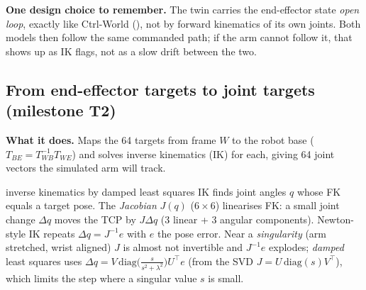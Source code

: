 \textbf{One design choice to remember.} The twin carries the end-effector state \emph{open loop}, exactly like Ctrl-World (), not by forward kinematics of its own joints. Both models then follow the same commanded path; if the arm cannot follow it, that shows up as IK flags, not as a slow drift between the two.

\subsection{From end-effector targets to joint targets (milestone T2) \done}\label{twin:sec:ik}
\textbf{What it does.} Maps the 64 targets from frame $W$ to the robot base ($T_{BE}=T_{WB}^{-1}T_{WE}$) and solves inverse kinematics (IK) for each, giving 64 joint vectors the simulated arm will track.

\begin{newc}{inverse kinematics by damped least squares}
IK finds joint angles $q$ whose FK equals a target pose. The \emph{Jacobian} $J(q)$ ($6\times6$) linearises FK: a small joint change $\Delta q$ moves the TCP by $J\Delta q$ (3 linear + 3 angular components). Newton-style IK repeats $\Delta q=J^{-1}e$ with $e$ the pose error. Near a \emph{singularity} (arm stretched, wrist aligned) $J$ is almost not invertible and $J^{-1}e$ explodes; \emph{damped} least squares uses $\Delta q=V\,\mathrm{diag}\!\big(\tfrac{s}{s^2+\lambda^2}\big)U^\top e$ (from the SVD $J=U\,\mathrm{diag}(s)V^\top$), which limits the step where a singular value $s$ is small.
\end{newc}


